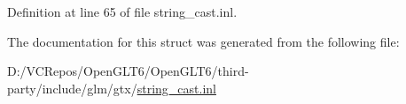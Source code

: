 Definition at line 65 of file string\+\_\+cast.\+inl.



The documentation for this struct was generated from the following file\+:\begin{DoxyCompactItemize}
\item 
D\+:/\+V\+C\+Repos/\+Open\+G\+L\+T6/\+Open\+G\+L\+T6/third-\/party/include/glm/gtx/\mbox{\hyperlink{string__cast_8inl}{string\+\_\+cast.\+inl}}\end{DoxyCompactItemize}
